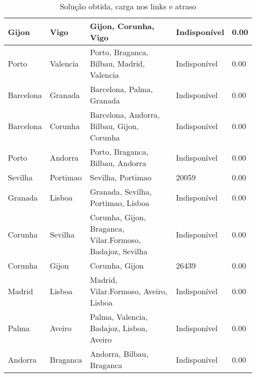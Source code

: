 \begin{table}[!htb]
{\begin{tabular}{|l|l|l|l|l|}
Gijon & Vigo & Gijon, Corunha, Vigo & Indisponível & 0.00 \\ \hline
Porto & Valencia & Porto, Braganca, Bilbau, Madrid, Valencia & Indisponível & 0.00 \\ \hline
Barcelona & Granada & Barcelona, Palma, Granada & Indisponível & 0.00 \\ \hline
Barcelona & Corunha & Barcelona, Andorra, Bilbau, Gijon, Corunha & Indisponível & 0.00 \\ \hline
Porto & Andorra & Porto, Braganca, Bilbau, Andorra & Indisponível & 0.00 \\ \hline
Sevilha & Portimao & Sevilha, Portimao & 20059 & 0.00 \\ \hline
Granada & Lisboa & Granada, Sevilha, Portimao, Lisboa & Indisponível & 0.00 \\ \hline
Corunha & Sevilha & Corunha, Gijon, Braganca, Vilar.Formoso, Badajoz, Sevilha & Indisponível & 0.00 \\ \hline
Corunha & Gijon & Corunha, Gijon & 26439 & 0.00 \\ \hline
Madrid & Lisboa & Madrid, Vilar.Formoso, Aveiro, Lisboa & Indisponível & 0.00 \\ \hline
Palma & Aveiro & Palma, Valencia, Badajoz, Lisboa, Aveiro & Indisponível & 0.00 \\ \hline
Andorra & Braganca & Andorra, Bilbau, Braganca & Indisponível & 0.00 \\ \hline
\end{tabular}}
\caption[]{Solução obtida, carga nos links e atraso}
\end{table}

\begin{table}[!htb]
        \centering
\caption[]{Solução obtida, carga nos links e atraso}
\end{table}

